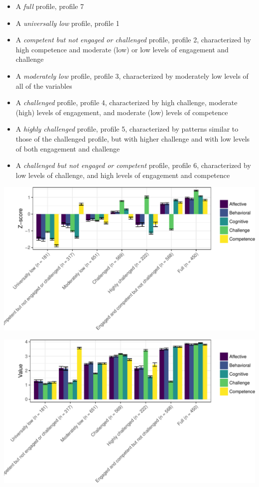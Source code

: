 \documentclass[]{book}
\providecommand{\tightlist}{%
  \setlength{\itemsep}{0pt}\setlength{\parskip}{0pt}}
\theoremstyle{definition}
\theoremstyle{definition}
\theoremstyle{definition}
\theoremstyle{remark}
\begin{document}
\begin{itemize}
\tightlist
\item
  A \emph{full} profile, profile 7
\item
  A \emph{universally low} profile, profile 1
\item
  A \emph{competent but not engaged or challenged} profile, profile 2,
  characterized by high competence and moderate (low) or low levels of
  engagement and challenge
\item
  A \emph{moderately low} profile, profile 3, characterized by
  moderately low levels of all of the variables
\item
  A \emph{challenged} profile, profile 4, characterized by high
  challenge, moderate (high) levels of engagement, and moderate (low)
  levels of competence
\item
  A \emph{highly challenged} profile, profile 5, characterized by
  patterns similar to those of the challenged profile, but with higher
  challenge and with low levels of both engagement and challenge
\item
  A \emph{challenged but not engaged or competent} profile, profile 6,
  characterized by low levels of challenge, and high levels of
  engagement and competence
\end{itemize}

\begin{center}\includegraphics[width=0.9\linewidth]{rosenberg-dissertation_files/figure-latex/m1_7p-1} \end{center}

\begin{center}\includegraphics[width=0.9\linewidth]{rosenberg-dissertation_files/figure-latex/m1_7p-2} \end{center}
\end{document}
